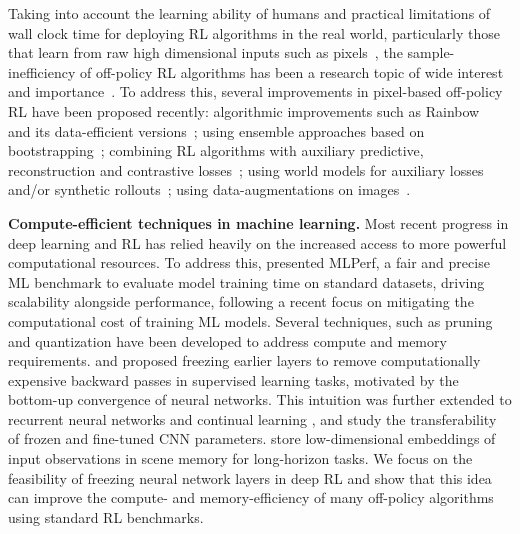 \documentclass{article}
\begin{document}
Taking into account the learning ability of humans and practical limitations of wall clock time for deploying RL algorithms in the real world, particularly those that learn from raw high dimensional inputs such as pixels~\citep{kalashnikov2018qt}, the sample-inefficiency of off-policy RL algorithms has been a research topic of wide interest and importance~\citep{lake2017building, kaiser2019model}. To address this, several improvements in pixel-based off-policy RL have been proposed recently: algorithmic improvements such as Rainbow~\citep{hessel2018rainbow} and its data-efficient versions~\citep{van2019use}; using ensemble approaches based on bootstrapping~\citep{osband2016deep, lee2020sunrise}; combining RL algorithms with auxiliary predictive, reconstruction and contrastive losses~\citep{jaderberg2016reinforcement, higgins2017darla, oord2018representation, yarats2019improving, srinivas2020curl, stooke2020decoupling}; using world models for auxiliary losses and/or synthetic rollouts~\citep{sutton1991dyna, ha2018world, kaiser2019model, hafner2019dream}; using data-augmentations on images~\citep{laskin2020reinforcement, kostrikov2020image}.




{\bf Compute-efficient techniques in machine learning.} 
Most recent progress in deep learning and RL has relied heavily on the increased access to more powerful computational resources. To address this, \citet{mattson2019mlperf} presented MLPerf, a fair and precise ML benchmark to evaluate model training time on standard datasets, driving scalability alongside performance, following a recent focus on mitigating the computational cost of training ML models.
Several techniques, such as pruning and quantization \citep{han2015deep,frankle2018lottery,blalock2020state,iandola2016squeezenet,tay2019lightweight} have been developed to address compute and memory requirements. \citet{46337} and \citet{brock2017freezeout} proposed freezing earlier layers to remove computationally expensive backward passes in supervised learning tasks, motivated by the bottom-up convergence of neural networks. This intuition was further extended to recurrent neural networks \citep{morcos2018insights} and continual learning \citep{pellegrini2019latent}, and \citet{yosinski2014transferable} study the transferability of frozen and fine-tuned CNN parameters. \citet{fang2019scene} store low-dimensional embeddings of input observations in scene memory for long-horizon tasks. We focus on the feasibility of freezing neural network layers in deep RL and show that this idea can improve the compute- and memory-efficiency of many off-policy algorithms using standard RL benchmarks.
\end{document}
